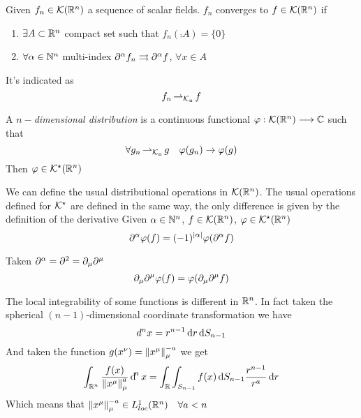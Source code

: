 \documentclass[../complete.tex]{subfiles}
\begin{document}
\begin{dfn}[$\K(\R^n)-$Convergence]
	Given $f_n\in\mathcal{K}(\mathbb{R}^n)$ a sequence of scalar fields. $f_n$ converges to $f\in\mathcal{K}(\mathbb{R}^n)$ if
	\begin{enumerate}
	\item $\exists A\subset\mathbb{R}^n$ compact set such that $f_n\left( \comp{A} \right)=\{0\}$
	\item $\forall\alpha\in\mathbb{N}^n$ multi-index $\partial^\alpha f_n\rightrightarrows\partial^\alpha f$, $\forall x\in A$
	\end{enumerate}
	It's indicated as
	\begin{equation*}
		f_n\operatorname{\rightharpoonup_{\mathcal{K}_n}} f
	\end{equation*}
\end{dfn}
\begin{dfn}
	A $n-$\textit{dimensional distribution} is a continuous functional $\varphi:\mathcal{K}(\mathbb{R}^n)\overset{}{\longrightarrow}\mathbb{C}$ such that
	\begin{equation}
		\forall g_n\operatorname{\rightharpoonup_{\mathcal{K}_n}} g\quad \varphi(g_n)\to\varphi(g)
		\label{eq:ndimdist}
	\end{equation}
	Then $\varphi\in\mathcal{K}^\star(\mathbb{R}^n)$
\end{dfn}
\begin{thm}
	We can define the usual distributional operations in $\mathcal{K}(\mathbb{R}^n)$. The usual operations defined for $\mathcal{K}^\star$ are defined in the same way, the only difference is given by the definition of the derivative
	Given $\alpha\in\mathbb{N}^n$, $f\in\mathcal{K}(\mathbb{R}^n)$, $\varphi\in\mathcal{K}^\star(\mathbb{R}^n)$
	\begin{equation}
		\partial^\alpha\varphi(f)=(-1)^{\abs{\alpha}}\varphi(\partial^\alpha f)
		\label{eq:distderrn}
	\end{equation}
\end{thm}
\begin{eg}
	Taken $\partial^\alpha=\partial^2=\partial_\mu\partial^\mu$
	\begin{equation*}
		\partial_\mu\partial^\mu\varphi(f)=\varphi(\partial_\mu\partial^\mu f)
	\end{equation*}
\end{eg}
\begin{rmk}
	The local integrability of some functions is different in $\mathbb{R}^n$. In fact taken the spherical $(n-1)$-dimensional coordinate transformation we have
	\begin{equation*}
		d^nx=r^{n-1}\operatorname{d\!} r\operatorname{d\!} S_{n-1}
	\end{equation*}
	And taken the function $g(x^\nu)=\norm{x^\mu}_\mu^{-a}$ we get
	\begin{equation*}
		\int_{\mathbb{R}^n}^{}\frac{f(x)}{\norm{x^\mu}_\mu^a}\operatorname{d\!}^nx=\int_{\mathbb{R}}^{}\int_{S_{n-1}}f(x)\operatorname{d\!} S_{n-1}\frac{r^{n-1}}{r^a}\operatorname{d\!} r
	\end{equation*}
	Which means that $\norm{x^\mu}_\mu^{-a}\in L^1_{loc}(\mathbb{R}^n)\quad\forall a<n$
\end{rmk}
\end{document}
